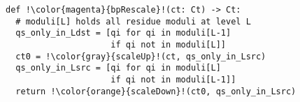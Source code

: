 \begin{figure}
\begin{lstlisting}[escapechar=!,label=lst:bpRescale,caption={
  Implementation of \texttt{bpRescale}.
}]
def !\color{magenta}{bpRescale}!(ct: Ct) -> Ct:
  # moduli[L] holds all residue moduli at level L
  qs_only_in_Ldst = [qi for qi in moduli[L-1]
                     if qi not in moduli[L]]
  ct0 = !\color{gray}{scaleUp}!(ct, qs_only_in_Lsrc)
  qs_only_in_Lsrc = [qi for qi in moduli[L]
                     if qi not in moduli[L-1]]
  return !\color{orange}{scaleDown}!(ct0, qs_only_in_Lsrc)
\end{lstlisting}
\end{figure}
